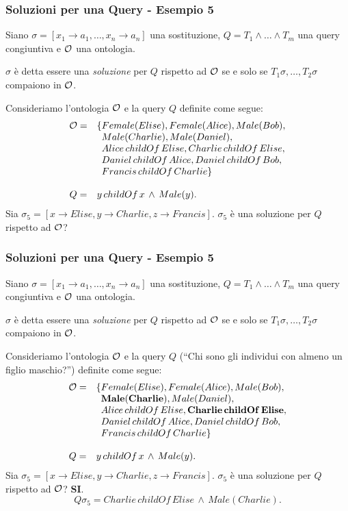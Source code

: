 \documentclass[8pt]{beamer}
\begin{document}
\begin{frame}
\frametitle{Soluzioni per una Query - Esempio 5}
Siano $\sigma=[x_1 \rightarrow a_1, \ldots, x_n \rightarrow a_n]$ una sostituzione,
$Q=T_1 \wedge \ldots \wedge T_m$ una query congiuntiva e $\mathcal{O}$ una ontologia.
\vspace{\baselineskip}

$\sigma$ \`e detta essere una \emph{soluzione} per $Q$ rispetto ad $\mathcal{O}$ se
e solo se $T_1\sigma, \ldots, T_2\sigma$ compaiono in $\mathcal{O}$. 
\vspace{\baselineskip}

Consideriamo l'ontologia $\mathcal{O}$ e la query $Q$ definite come segue:
\[
\begin{array}{cl}
  \Ont  =  &  \{Female(Elise), Female(Alice), Male(Bob), \\
  &\phantom{\{}Male(Charlie), Male(Daniel), \\
  &\phantom{\{}Alice\,childOf\,Elise, Charlie\,childOf\,Elise, \\
  &\phantom{\{}Daniel\,childOf\,Alice, Daniel\,childOf\,Bob, \\
  &\phantom{\{}Francis\,childOf\,Charlie \}\\
  &\\
  Q = & y\,childOf\,x\,\wedge\,Male(y) .
 \end{array}
\]
Sia $\sigma_5=[x \rightarrow Elise, y \rightarrow Charlie, z \rightarrow Francis]$. $\sigma_5$ \`e una soluzione per $Q$
rispetto ad $\mathcal{O}$?
\end{frame}

\begin{frame}
\frametitle{Soluzioni per una Query - Esempio 5}
Siano $\sigma=[x_1 \rightarrow a_1, \ldots, x_n \rightarrow a_n]$ una sostituzione,
$Q=T_1 \wedge \ldots \wedge T_m$ una query congiuntiva e $\mathcal{O}$ una ontologia.
\vspace{\baselineskip}

$\sigma$ \`e detta essere una \emph{soluzione} per $Q$ rispetto ad $\mathcal{O}$ se
e solo se $T_1\sigma, \ldots, T_2\sigma$ compaiono in $\mathcal{O}$. 
\vspace{\baselineskip}

Consideriamo l'ontologia $\mathcal{O}$ e la query $Q$ (``Chi sono gli individui con almeno un figlio maschio?'') definite come segue:
\[
\begin{array}{cl}
  \Ont  =  &  \{Female(Elise), Female(Alice), Male(Bob), \\
  &\phantom{\{}\mathbf{Male(Charlie)}, Male(Daniel), \\
  &\phantom{\{}Alice\,childOf\,Elise, \mathbf{Charlie\,childOf\,Elise}, \\
  &\phantom{\{}Daniel\,childOf\,Alice, Daniel\,childOf\,Bob, \\
  &\phantom{\{}Francis\,childOf\,Charlie \}\\
  &\\
  Q = & y\,childOf\,x\,\wedge\,Male(y) .
 \end{array}
\]
Sia $\sigma_5=[x \rightarrow Elise, y \rightarrow Charlie, z \rightarrow Francis]$. $\sigma_5$ \`e una soluzione per $Q$
rispetto ad $\mathcal{O}$? \textbf{SI}.
\[
 Q\sigma_5 = Charlie\,childOf\,Elise\,\wedge\,Male(Charlie) .
\]
\end{frame}
\end{document}

